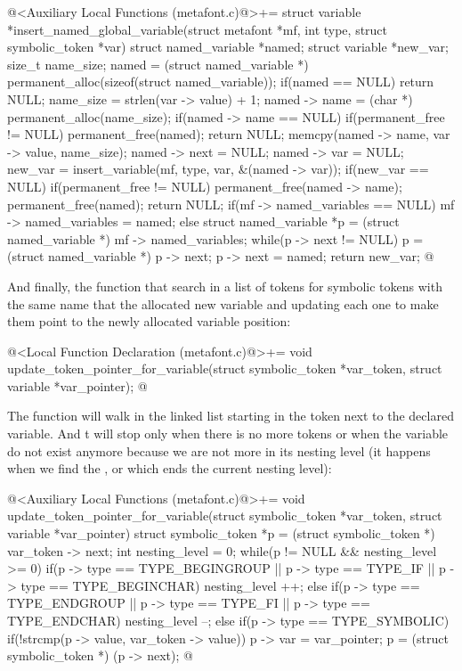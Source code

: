 \iniciocodigo
@<Auxiliary Local Functions (metafont.c)@>+=
struct variable *insert_named_global_variable(struct metafont *mf,
                                             int type,
                                             struct symbolic_token *var){
  struct named_variable *named;
  struct variable *new_var;
  size_t name_size;
  named = (struct named_variable *)
              permanent_alloc(sizeof(struct named_variable));
  if(named == NULL)
    return NULL;
  name_size = strlen(var -> value) + 1;
  named -> name = (char *) permanent_alloc(name_size);
  if(named -> name == NULL){
    if(permanent_free != NULL)
      permanent_free(named);
    return NULL;
  }
  memcpy(named -> name, var -> value, name_size);
  named -> next = NULL;
  named -> var = NULL;
  new_var = insert_variable(mf, type, var, &(named -> var));
  if(new_var == NULL){
    if(permanent_free != NULL){
      permanent_free(named -> name);
      permanent_free(named);
      return NULL;
    }
  }
  if(mf -> named_variables == NULL)
    mf -> named_variables = named;
  else{
    struct named_variable *p = (struct named_variable *)
                                   mf -> named_variables;
    while(p -> next != NULL)
      p = (struct named_variable *) p -> next;
    p -> next = named;
  }
  return new_var;
}
@
\fimcodigo

And finally, the function that search in a list of tokens for symbolic
tokens with the same name that the allocated new variable and updating
each one to make them point to the newly allocated variable position:

\iniciocodigo
@<Local Function Declaration (metafont.c)@>+=
void update_token_pointer_for_variable(struct symbolic_token *var_token,
                                      struct variable *var_pointer);
@
\fimcodigo

The function will walk in the linked list starting in the token next
to the declared variable. And t will stop only when there is no more
tokens or when the variable do not exist anymore because we are not
more in its nesting level (it happens when we find
the ,  or 
which ends the current nesting level):

\iniciocodigo
@<Auxiliary Local Functions (metafont.c)@>+=
void update_token_pointer_for_variable(struct symbolic_token *var_token,
                                      struct variable *var_pointer){
  struct symbolic_token *p = (struct symbolic_token *) var_token -> next;
  int nesting_level = 0;
  while(p != NULL && nesting_level >= 0){
    if(p -> type == TYPE_BEGINGROUP || p -> type == TYPE_IF ||
       p -> type == TYPE_BEGINCHAR)
      nesting_level ++;
    else if(p -> type == TYPE_ENDGROUP || p -> type == TYPE_FI ||
            p -> type == TYPE_ENDCHAR)
      nesting_level --;
    else if(p -> type == TYPE_SYMBOLIC){
      if(!strcmp(p -> value, var_token -> value)){
        p -> var = var_pointer;
      }
    }
    p = (struct symbolic_token *) (p -> next);
  }
}
@
\fimcodigo

